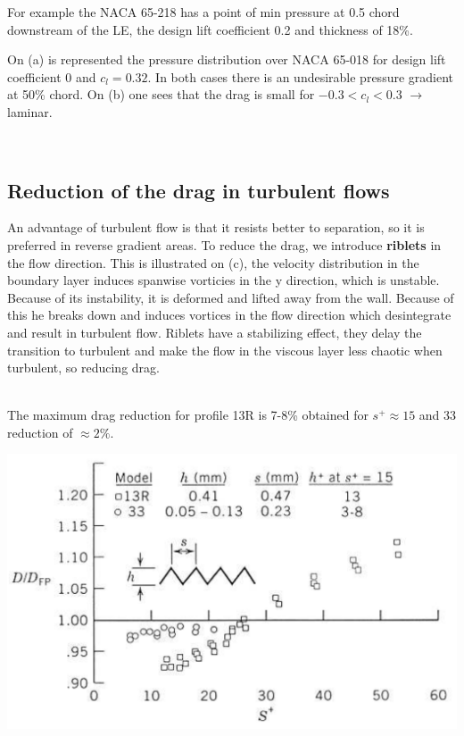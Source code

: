 	For example the NACA 65-218 has a point of min pressure at 0.5 chord downstream of the LE, the design lift coefficient 0.2 and thickness of 18\%. 
	
	On (a) is represented the pressure distribution over NACA 65-018 for design lift coefficient 0 and $c_l=0.32$. In both cases there is an undesirable pressure gradient at 50\% chord. On (b) one sees that the drag is small for $-0.3 < c_l <0.3$ $\rightarrow$ laminar. 

\ \\[5cm]
\subsection{Reduction of the drag in turbulent flows}
	An advantage of turbulent flow is that it resists better to separation, so it is preferred in reverse gradient areas. To reduce the drag, we introduce \textbf{riblets} in the flow direction.  This is illustrated on (c), the velocity distribution in the boundary layer induces spanwise vorticies in the y direction, which is unstable. Because of its instability, it is deformed and lifted away from the wall. Because of this he breaks down and induces vortices in the flow direction which desintegrate and result in turbulent flow. Riblets have a stabilizing effect, they delay the transition to turbulent and make the flow in the viscous layer less chaotic when turbulent, so reducing drag.  
	
	\ \\ 
	
	The maximum drag reduction for profile 13R is 7-8\% obtained for $s^+ \approx 15$ and 33 reduction of $\approx 2\%$. 
	\\
	
	\begin{center}
	\includegraphics[scale=0.3]{ch4/7}
	\end{center}
	